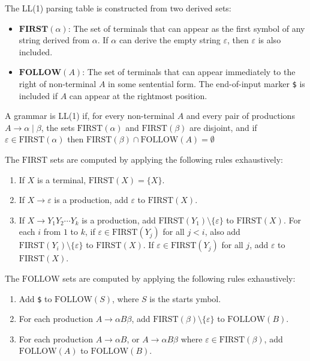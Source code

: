 \documentclass[letterpaper,12pt,oneside]{article}
\begin{document}
The LL(1) parsing table is constructed from two derived sets:

\begin{itemize}
    \item $\textbf{FIRST}(\alpha)$: The set of terminals that can appear as the first symbol of any string derived from $\alpha$. If $\alpha$ can derive the empty string $\varepsilon$, then $\varepsilon$ is also included.
    \item $\textbf{FOLLOW}(A)$: The set of terminals that can appear
          immediately to the right of non-terminal $A$ in some sentential
          form. The end-of-input marker \texttt{\$} is included if $A$ can
          appear at the rightmost position.
\end{itemize}

A grammar is LL(1) if, for every non-terminal $A$ and every pair of
productions $A \rightarrow \alpha \mid \beta$, the sets $\text{FIRST}(\alpha)$ and $\text{FIRST}(\beta)$ are disjoint, and if $\varepsilon \in \text{FIRST}(\alpha)$ then $\text{FIRST}(\beta) \cap \text{FOLLOW}(A) = \emptyset$

The $\text{FIRST}$ sets are computed by applying the following rules
exhaustively:

\begin{enumerate}
    \item If $X$ is a terminal, $\text{FIRST}(X) = \{X\}$.
    \item If $X \rightarrow \varepsilon$ is a production, add $\varepsilon$ to $\text{FIRST}(X)$.
    \item If $X \rightarrow Y_1 Y_2 \cdots Y_k$ is a production, add
          $\text{FIRST}(Y_1) \setminus \{\varepsilon\}$ to $\text{FIRST}(X)$. For each $i$ from $1$ to $k$, if $\varepsilon \in \text{FIRST}(Y_j)$ for all $j < i$, also add $\text{FIRST}(Y_i) \setminus \{\varepsilon\}$ to $\text{FIRST}(X)$. If $\varepsilon \in \text{FIRST}(Y_j)$ for all $j$, add $\varepsilon$ to $\text{FIRST}(X)$.
\end{enumerate}

The $\text{FOLLOW}$ sets are computed by applying the following rules exhaustively:

\begin{enumerate}
    \item Add \texttt{\$} to $\text{FOLLOW}(S)$, where $S$ is the starts ymbol.
    \item For each production $A \rightarrow \alpha B \beta$, add
          $\text{FIRST}(\beta) \setminus \{\varepsilon\}$ to $\text{FOLLOW}(B)$.
    \item For each production $A \rightarrow \alpha B$, or $A \rightarrow \alpha B \beta$ where $\varepsilon \in \text{FIRST}(\beta)$, add $\text{FOLLOW}(A)$ to $\text{FOLLOW}(B)$.
\end{enumerate}
\end{document}
